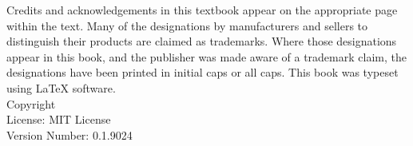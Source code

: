 \documentclass{book}
\makeatletter
\newcommand{\booklicense}{MIT License}
\newcommand{\bookversion}{0.1.9024}
\newcommand{\bookauthor}{\@author}
\makeatother
\begin{document}
\thispagestyle{empty}

\begin{flushleft}
\vspace*{\fill}
Credits and acknowledgements in this textbook appear on the appropriate page within the text.
\newline
\newline
Many of the designations by manufacturers and sellers to distinguish their products are claimed as trademarks. Where those designations appear in this book, and the publisher was made aware of a trademark claim, the designations have been printed in initial caps or all caps.
\newline
\newline
This book was typeset using \LaTeX{} software.\\
\vspace{\fill}
Copyright \textcopyright{} \the\year{}  \bookauthor\\
License: \booklicense\\
Version Number: \bookversion
\end{flushleft}

\addtocounter{page}{2}



\setcounter{tocdepth}{3}
\tableofcontents

\mainmatter



























\backmatter
\end{document}
